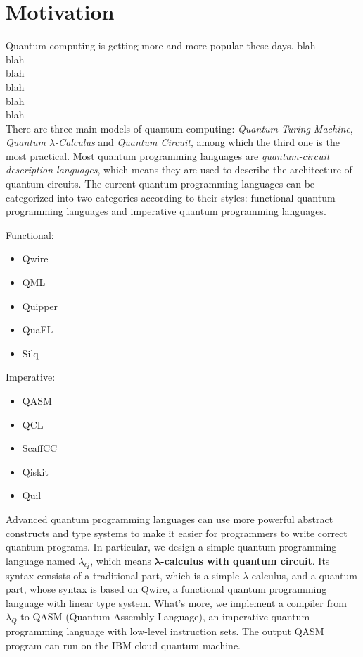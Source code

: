 \section{Motivation}
Quantum computing is getting more and more popular these days.
blah\\
blah\\
blah\\
blah\\
blah\\
blah\\

There are three main models of quantum computing: \textit{Quantum Turing Machine}, \textit{Quantum $\lambda$-Calculus} and \textit{Quantum Circuit}, among which the third one is the most practical.
Most quantum programming languages are \textit{quantum-circuit description languages}, which means they are used to describe the architecture of quantum circuits.
The current quantum programming languages can be categorized into two categories according to their styles: functional quantum programming languages and imperative quantum programming languages.
\begin{multicols}{2}
  \begin{center}
      Functional:
  \end{center}
\begin{itemize}
    \item Qwire
    \item QML
    \item Quipper
    \item QuaFL
    \item Silq
\end{itemize}

  \columnbreak

  \begin{center}
          Imperative:
  \end{center}
\begin{itemize}
    \item QASM
    \item QCL
    \item ScaffCC
    \item Qiskit
    \item Quil
\end{itemize}
\end{multicols}

Advanced quantum programming languages can use more powerful abstract constructs and type systems to make it easier for programmers to write correct quantum programs.
In particular, we design a simple quantum programming language named $\lambda_Q$, which means \textbf{$\boldsymbol{\lambda}$-calculus with quantum circuit}.
Its syntax consists of a traditional part, which is a simple $\lambda$-calculus, and a quantum part, whose syntax is based on Qwire, a functional quantum programming language with linear type system.
What's more, we implement a compiler from $\lambda_Q$ to QASM (Quantum Assembly Language), an imperative quantum programming language with low-level instruction sets.
The output QASM program can run on the IBM cloud quantum machine.

